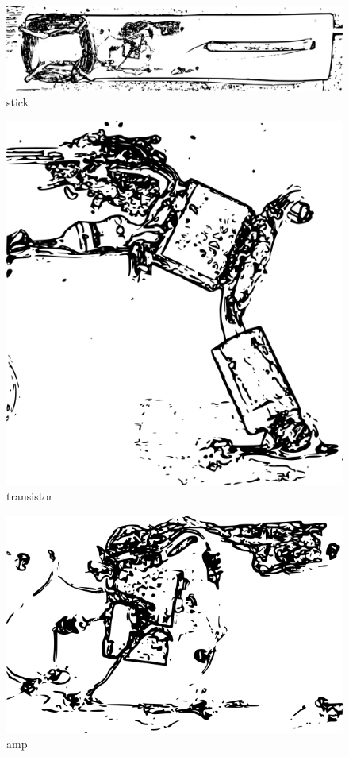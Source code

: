 \begin{figure}[htbp]
\centering
\includegraphics{images/bigoscillator.png}
\caption{stick}
\end{figure}

\begin{figure}[htbp]
\centering
\includegraphics{images/transistorimage.png}
\caption{transistor}
\end{figure}

\begin{figure}[htbp]
\centering
\includegraphics{images/ampimage.png}
\caption{amp}
\end{figure}

